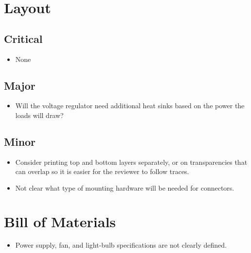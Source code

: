 \documentclass[11pt]{article}
\begin{document}
\section*{Layout} 

\subsection*{Critical}

\begin{itemize}

    \item None
    
\end{itemize}

\subsection*{Major}

\begin{itemize}

    \item Will the voltage regulator need additional heat sinks based on the power the loads will draw?

\end{itemize}
		
\subsection*{Minor}

\begin{itemize}

    \item Consider printing top and bottom layers separately, or on transparencies that can overlap so it is easier for the reviewer to follow traces.
    \item Not clear what type of mounting hardware will be needed for connectors.

\end{itemize}

\section*{Bill of Materials} 

\begin{itemize}

    \item Power supply, fan, and light-bulb specifications are not clearly defined.
    
\end{itemize}

	
\end{document}
